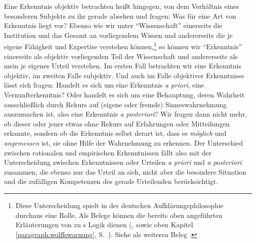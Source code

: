 Eine Erkenntnis objektiv betrachten heißt hingegen, von dem
Verhältnis eines besonderen Subjekts zu ihr gerade absehen und
fragen: Was für eine Art von Erkenntnis liegt vor? Ebenso wie wir unter
\enquote{Wissenschaft} einerseits die Institution und das Gesamt an vorliegendem
Wissen und andererseits die je eigene Fähigkeit und Expertise verstehen
können,\footnote{Diese Unterscheidung spielt in der deutschen
Aufklärungsphilosophie durchaus eine Rolle. Als Belege können die bereits oben
angeführten Erläuterungen von
zu s Logik
dienen
\mkbibparens{\cite[vgl.][\S~44]{Stiebritz:ErlaeuterungenderVernuenftigenGedanckenvondenKraefftendesmenschlichenVerstandesWolffs1977},
sowie oben Kapitel \ref{paragraph:wolffswarnung},
S.~\pageref{Anmerkung:StiebritzZuSubiectiveundObiective}}. Siehe als weiteren
Beleg \cite[][4]{Mendelssohn:UeberdieFrage:washeisstaufklaeren?2008}.} so können
wir \enquote{Erkenntnis} einerseits als objektiv vorliegenden Teil der Wissenschaft
und andererseits als mein je eigenes Urteil verstehen. Im ersten Fall
betrachten wir eine Erkenntnis objektiv, im zweiten Falle subjektiv. Und auch im
Falle objektiver Erkenntnisse lässt sich fragen: Handelt es sich um eine
Erkenntnis \emph{a priori}, eine Vernunfterkenntnis? Oder handelt es sich um
eine Behauptung, deren Wahrheit ausschließlich durch Rekurs auf (eigene oder
fremde) Sinneswahrnehmung auszumachen ist, also eine Erkenntnis \emph{a
posteriori}? Wir fragen dann nicht mehr, ob dieser oder jener etwas ohne Rekurs
auf Erfahrungen oder Mitteilungen erkannte, sondern ob die Erkenntnis selbst
derart ist, dass es \emph{möglich} und \emph{angemessen} ist, sie ohne Hilfe der
Wahrnehmung zu erkennen. Der Unterschied zwischen rationalen und empirischen
Erkenntnissen fällt also mit der Unterscheidung zwischen Erkenntnissen oder
Urteilen \emph{a priori} und \emph{a posteriori} zusammen, die ebenso nur das
Urteil an sich, nicht aber die besondere Situation und die zufälligen
Kompetenzen des gerade Urteilenden berücksichtigt.


